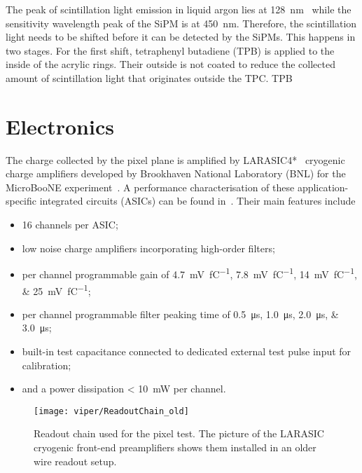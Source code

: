 The peak of scintillation light emission in liquid argon lies at \SI{128}{\nano\metre}~\cite{sauce} while the sensitivity wavelength peak of the SiPM is at \SI{450}{\nano\metre}.
Therefore, the scintillation light needs to be shifted before it can be detected by the SiPMs.
This happens in two stages.
For the first shift, tetraphenyl butadiene (TPB) is applied to the inside of the acrylic rings.
Their outside is not coated to reduce the collected amount of scintillation light that originates outside the TPC.
TPB 


\section{Electronics\label{sec:rd-dune-nd_electronics}}
The charge collected by the pixel plane is amplified by LARASIC4*~\cite{larasic} cryogenic charge amplifiers developed by Brookhaven National Laboratory (BNL) for the MicroBooNE experiment~\cite{uboone}.
A performance characterisation of these application-specific integrated circuits (ASICs) can be found in~\cite{AT_larasic}.
Their main features include

\begin{itemize}
	\item \num{16} channels per ASIC;
	\item low noise charge amplifiers incorporating high-order filters;
	\item per channel programmable gain of \SIlist[list-final-separator = { or }]{4.7; 7.8; 14; 25}{\milli\volt\per\femto\coulomb};
	\item per channel programmable filter peaking time of \SIlist[list-final-separator = { or }]{0.5; 1.0; 2.0; 3.0}{\micro\second};
	\item built-in test capacitance connected to dedicated external test pulse input for calibration;
	\item and a power dissipation \SI{< 10}{\milli\watt} per channel.
\end{itemize}

\begin{figure}[htb] %
	\centering
	\texttt{[image: viper/ReadoutChain\_old]}
	\caption{Readout chain used for the pixel test. The picture of the LARASIC cryogenic front-end preamplifiers shows them installed in an older wire readout setup.~\cite{AT_larasic}}
	\label{fig:viper_readoutChain_old}
\end{figure}

